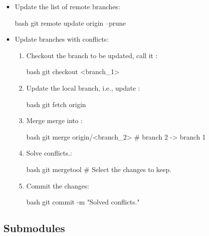 \begin{itemize}
    \item Update the list of remote branches:
    \begin{mintedbox}{bash}
git remote update origin --prune
    \end{mintedbox}
    \item Update branches with conflicts:
    \begin{enumerate}
        \item Checkout the branch to be updated, call it :
        \begin{mintedbox}{bash}
git checkout <branch_1>
        \end{mintedbox}
        \item Update the local branch, i.e., update :
        \begin{mintedbox}{bash}
git fetch origin
        \end{mintedbox}
        \item Merge merge  into :
        \begin{mintedbox}{bash}
git merge origin/<branch_2>  # branch 2 -> branch 1
        \end{mintedbox}
        \item Solve conflicts.:
        \begin{mintedbox}{bash}
git mergetool  # Select the changes to keep.
        \end{mintedbox}
        \item Commit the changes:
        \begin{mintedbox}{bash}
git commit -m "Solved conflicts."
        \end{mintedbox}
    \end{enumerate}
\end{itemize}


\subsection{Submodules}

